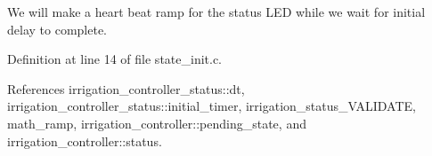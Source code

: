 We will make a heart beat ramp for the status L\+E\+D while we wait for initial delay to complete. 



Definition at line 14 of file state\+\_\+init.\+c.



References irrigation\+\_\+controller\+\_\+status\+::dt, irrigation\+\_\+controller\+\_\+status\+::initial\+\_\+timer, irrigation\+\_\+status\+\_\+\+V\+A\+L\+I\+D\+A\+T\+E, math\+\_\+ramp, irrigation\+\_\+controller\+::pending\+\_\+state, and irrigation\+\_\+controller\+::status.

